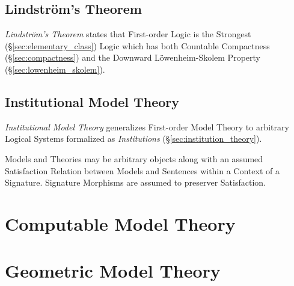 \subsection{Lindstr\"om's Theorem}\label{sec:lindstroms_theorem}

\emph{Lindstr\"om's Theorem} states that First-order Logic is the
Strongest (\S\ref{sec:elementary_class}) Logic which has both
Countable Compactness (\S\ref{sec:compactness}) and the Downward
L\"owenheim-Skolem Property (\S\ref{sec:lowenheim_skolem}).



\subsection{Institutional Model Theory}\label{sec:institutional_model}

\emph{Institutional Model Theory} generalizes First-order Model Theory
to arbitrary Logical Systems formalized as \emph{Institutions}
(\S\ref{sec:institution_theory}).

Models and Theories may be arbitrary objects along with an assumed
Satisfaction Relation between Models and Sentences within a Context of
a Signature. Signature Morphisms are assumed to preserver
Satisfaction.



\section{Computable Model Theory}\label{sec:computable_model}
\cite{harizanov98}




\section{Geometric Model Theory}\label{sec:geometric_model}

